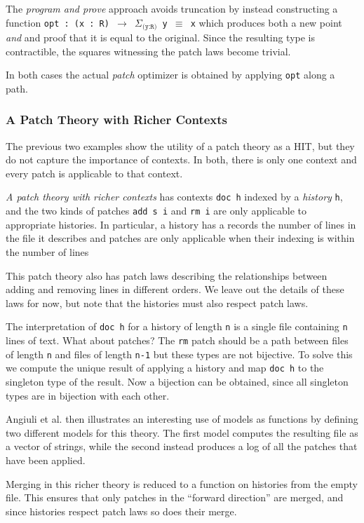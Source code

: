 The \emph{program and prove} approach avoids truncation by instead
constructing a function
\texttt{opt~:~(x~:~R)~$\rightarrow$~$\Sigma_\texttt{(y:R)}$~y~$\equiv$~x}
which produces both a new point \emph{and} and proof that
it is equal to the original. Since the resulting type is contractible, the
squares witnessing the patch laws become trivial.

In both cases the actual \emph{patch} optimizer is obtained by applying
\texttt{opt} along a path.

\subsubsection{A Patch Theory with Richer Contexts} 

The previous two examples show the utility of a patch theory as a HIT,
but they do not capture the importance of contexts. In both, there is only one
context and every patch is applicable to that context.

\emph{A patch theory with richer contexts} has contexts \texttt{doc h} indexed by a
\emph{history} \texttt{h}, and the two kinds of patches \texttt{add s i} and
\texttt{rm i} are only applicable to appropriate histories. In particular, a
history has a records the number of lines in the file it describes and patches
are only applicable when their indexing is within the number of lines

This patch theory also has patch laws describing the relationships between
adding and removing lines in different orders. We leave out the details of these
laws for now, but note that the histories must also respect patch laws.

The interpretation of \texttt{doc h} for a history of length \texttt{n} is a
single file containing \texttt{n} lines of text. What about patches? The
\texttt{rm} patch should be a path between files of length \texttt{n} and files
of length \texttt{n-1} but these types are not bijective. To solve this we
compute the unique result of applying a history and map \texttt{doc h} to the
singleton type of the result. Now a bijection can be obtained, since all
singleton types are in bijection with each other.

Angiuli et al. then illustrates an interesting use of models as functions by
defining two different models for this theory. The first model computes the
resulting file as a vector of strings, while the second instead produces a log
of all the patches that have been applied.

Merging in this richer theory is reduced to a function on histories from the
empty file. This ensures that only patches in the ``forward direction'' are
merged, and since histories respect patch laws so does their merge.

